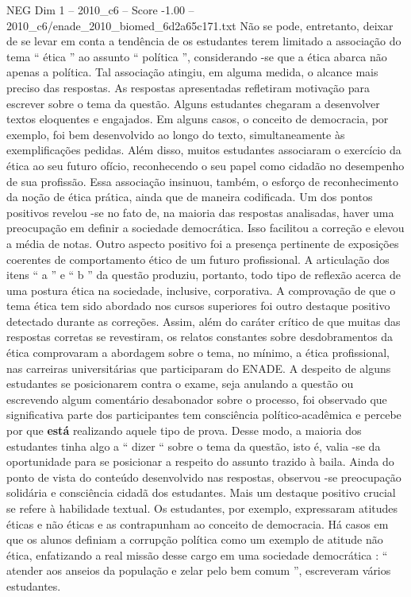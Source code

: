 \begin{textsample}{NEG Dim 1 – 2010\_c6 – Score -1.00 – 2010\_c6/enade\_2010\_biomed\_6d2a65c171.txt}
Não se pode, entretanto, deixar de se levar em conta a tendência de os estudantes terem limitado a associação do tema “ ética ” ao assunto “ política ”, considerando -se que a ética abarca não apenas a política.
Tal associação atingiu, em alguma medida, o alcance mais preciso das respostas.
As respostas apresentadas refletiram motivação para escrever sobre o tema da questão.
Alguns estudantes chegaram a desenvolver textos eloquentes e engajados.
Em alguns casos, o conceito de democracia, por exemplo, foi bem desenvolvido ao longo do texto, simultaneamente às exemplificações pedidas.
Além disso, muitos estudantes associaram o exercício da ética ao seu futuro ofício, reconhecendo o seu papel como cidadão no desempenho de sua profissão.
Essa associação insinuou, também, o esforço de reconhecimento da noção de ética prática, ainda que de maneira codificada.
Um dos pontos positivos revelou -se no fato de, na maioria das respostas analisadas, haver uma preocupação em definir a sociedade democrática.
Isso facilitou a correção e elevou a média de notas.
Outro aspecto positivo foi a presença pertinente de exposições coerentes de comportamento ético de um futuro profissional.
A articulação dos itens “ a ” e “ b ” da questão produziu, portanto, todo tipo de reflexão acerca de uma postura ética na sociedade, inclusive, corporativa.
A comprovação de que o tema ética tem sido abordado nos cursos superiores foi outro destaque positivo detectado durante as correções.
Assim, além do caráter crítico de que muitas das respostas corretas se revestiram, os relatos constantes sobre desdobramentos da ética comprovaram a abordagem sobre o tema, no mínimo, a ética profissional, nas carreiras universitárias que participaram do ENADE.
A despeito de alguns estudantes se posicionarem contra o exame, seja anulando a questão ou escrevendo algum comentário desabonador sobre o processo, foi observado que significativa parte dos participantes tem consciência político-acadêmica e percebe por que \textbf{está} realizando aquele tipo de prova.
Desse modo, a maioria dos estudantes tinha algo a “ dizer “ sobre o tema da questão, isto é, valia -se da oportunidade para se posicionar a respeito do assunto trazido à baila.
Ainda do ponto de vista do conteúdo desenvolvido nas respostas, observou -se preocupação solidária e consciência cidadã dos estudantes.
Mais um destaque positivo crucial se refere à habilidade textual.
Os estudantes, por exemplo, expressaram atitudes éticas e não éticas e as contrapunham ao conceito de democracia.
Há casos em que os alunos definiam a corrupção política como um exemplo de atitude não ética, enfatizando a real missão desse cargo em uma sociedade democrática : “ atender aos anseios da população e zelar pelo bem comum ”, escreveram vários estudantes.

\end{textsample}

